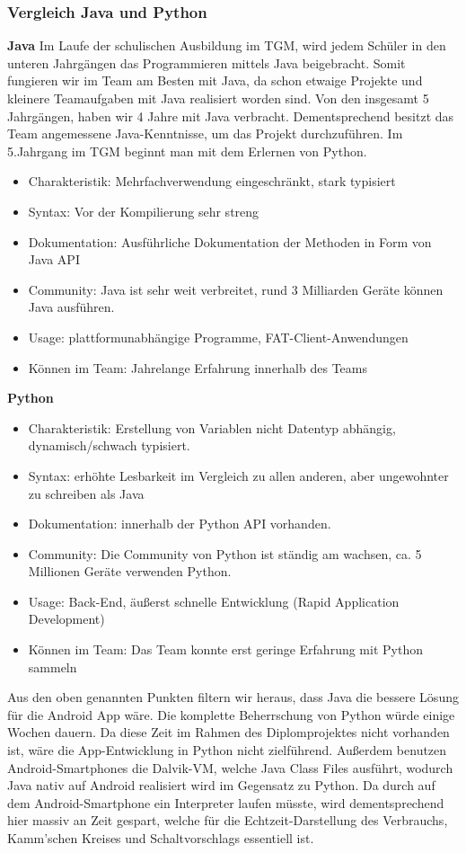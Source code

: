 \clearpage
\subsubsection{Vergleich Java und Python}
\textbf{Java\newline}
Im Laufe der schulischen Ausbildung im TGM, wird jedem Schüler in den unteren Jahrgängen das Programmieren mittels Java
beigebracht. Somit fungieren wir im Team am Besten mit Java, da schon etwaige Projekte und kleinere Teamaufgaben mit Java
realisiert worden sind. Von den insgesamt 5 Jahrgängen, haben wir 4 Jahre mit Java verbracht. Dementsprechend besitzt das Team
angemessene Java-Kenntnisse, um das Projekt durchzuführen. Im 5.Jahrgang im TGM beginnt man mit dem Erlernen von Python.
\begin{itemize}
	\item Charakteristik: Mehrfachverwendung eingeschränkt, stark typisiert
	\item Syntax: Vor der Kompilierung sehr streng
	\item Dokumentation: Ausführliche Dokumentation der Methoden in Form von Java API
	\item Community: Java ist sehr weit verbreitet, rund 3 Milliarden Geräte können Java ausführen.
	\item Usage: plattformunabhängige Programme, FAT-Client-Anwendungen
	\item Können im Team: Jahrelange Erfahrung innerhalb des Teams
\end{itemize}

\textbf{Python\newline}
\begin{itemize}
	\item Charakteristik: Erstellung von Variablen nicht Datentyp abhängig, dynamisch/schwach typisiert.
	\item Syntax: erhöhte Lesbarkeit im Vergleich zu allen anderen, aber ungewohnter zu schreiben als Java
	\item Dokumentation: innerhalb der Python API vorhanden.
	\item Community: Die Community von Python ist ständig am wachsen, ca. 5 Millionen Geräte verwenden Python.
	\item Usage: Back-End, äußerst schnelle Entwicklung (Rapid Application Development)
	\item Können im Team: Das Team konnte erst geringe Erfahrung mit Python sammeln
\end{itemize}

Aus den oben genannten Punkten filtern wir heraus, dass Java die bessere Lösung für die Android App wäre. 
Die komplette Beherrschung von Python würde einige Wochen dauern. 
Da diese Zeit im Rahmen des Diplomprojektes nicht vorhanden ist, wäre die App-Entwicklung in Python nicht zielführend. 
Außerdem benutzen Android-Smartphones die Dalvik-VM, welche Java Class Files ausführt, wodurch Java nativ auf Android realisiert wird im Gegensatz zu Python. 
Da durch auf dem Android-Smartphone ein Interpreter laufen müsste, wird dementsprechend hier massiv an Zeit gespart, welche für die Echtzeit-Darstellung des Verbrauchs, Kamm'schen Kreises und Schaltvorschlags essentiell ist.

